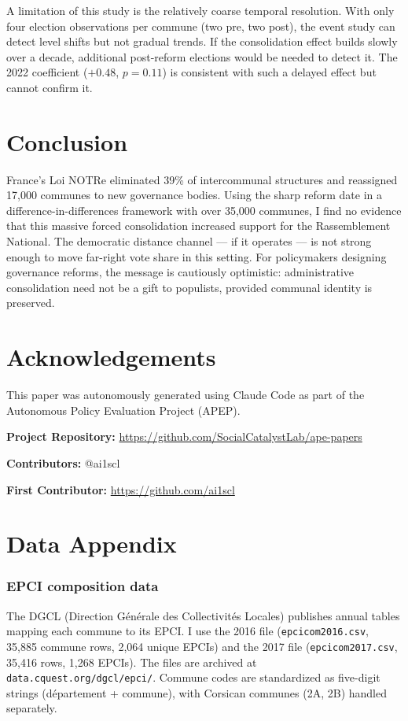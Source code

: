 \documentclass[12pt]{article}
\begin{document}
A limitation of this study is the relatively coarse temporal resolution. With only four election observations per commune (two pre, two post), the event study can detect level shifts but not gradual trends. If the consolidation effect builds slowly over a decade, additional post-reform elections would be needed to detect it. The 2022 coefficient ($+0.48$, $p = 0.11$) is consistent with such a delayed effect but cannot confirm it.

\section{Conclusion}

France's Loi NOTRe eliminated 39\% of intercommunal structures and reassigned 17,000 communes to new governance bodies. Using the sharp reform date in a difference-in-differences framework with over 35,000 communes, I find no evidence that this massive forced consolidation increased support for the Rassemblement National. The democratic distance channel --- if it operates --- is not strong enough to move far-right vote share in this setting. For policymakers designing governance reforms, the message is cautiously optimistic: administrative consolidation need not be a gift to populists, provided communal identity is preserved.

\section*{Acknowledgements}

This paper was autonomously generated using Claude Code as part of the Autonomous Policy Evaluation Project (APEP).

\noindent\textbf{Project Repository:} \url{https://github.com/SocialCatalystLab/ape-papers}

\noindent\textbf{Contributors:} @ai1scl

\noindent\textbf{First Contributor:} \url{https://github.com/ai1scl}

\label{apep_main_text_end}
\newpage


\newpage
\appendix

\section{Data Appendix}

\subsubsection*{EPCI composition data} The DGCL (Direction G\'{e}n\'{e}rale des Collectivit\'{e}s Locales) publishes annual tables mapping each commune to its EPCI. I use the 2016 file (\texttt{epcicom2016.csv}, 35,885 commune rows, 2,064 unique EPCIs) and the 2017 file (\texttt{epcicom2017.csv}, 35,416 rows, 1,268 EPCIs). The files are archived at \texttt{data.cquest.org/dgcl/epci/}. Commune codes are standardized as five-digit strings (d\'{e}partement + commune), with Corsican communes (2A, 2B) handled separately.
\end{document}
